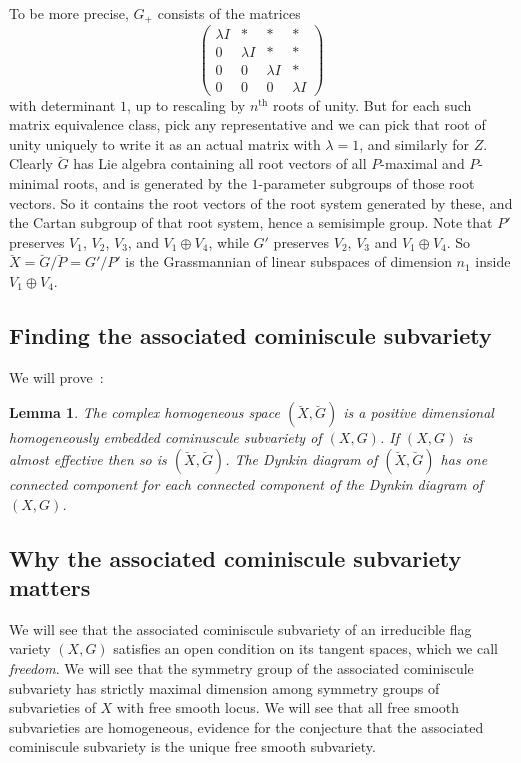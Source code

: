 \documentclass[a4paper,10pt]{amsart}
\newtheorem{lemma}{Lemma}
\theoremstyle{remark}
\begin{document}
To be more precise, \(G_+\) consists of the matrices 
\[
\begin{pmatrix}
\lambda I&*&*&*\\
0&\lambda I&*&*\\
0&0&\lambda I&*\\
0&0&0&\lambda I
\end{pmatrix}
\]
with determinant \(1\), up to rescaling by \(n^{\text{th}}\) roots of unity.
But for each such matrix equivalence class, pick any representative and we can pick that root of unity uniquely to write it as an actual matrix with \(\lambda=1\), and similarly for \(Z\).
Clearly \(\breve{G}\) has Lie algebra containing all root vectors of all \(P\)-maximal and \(P\)-minimal roots, and is generated by the \(1\)-parameter subgroups of those root vectors.
So it contains the root vectors of the root system generated by these, and the Cartan subgroup of that root system, hence a semisimple group.
Note that \(P'\) preserves \(V_1\), \(V_2\), \(V_3\), and \(V_1\oplus V_4\), while
\(G'\) preserves \(V_2\), \(V_3\) and \(V_1\oplus V_4\).
So \(\breve{X}=\breve{G}/\breve{P}=G'/P'\) is the Grassmannian of linear subspaces of dimension \(n_1\) inside \(V_1\oplus V_4\).

\subsection{Finding the associated cominiscule subvariety}
We will prove~:
\begin{lemma}\label{lemma:associated.cominuscule}
The complex homogeneous space \((\breve{X},\breve{G})\) is a positive dimensional homogeneously embedded cominuscule subvariety of \((X,G)\).
If \((X,G)\) is almost effective then so is \((\breve{X},\breve{G})\).
The Dynkin diagram of \((\breve{X},\breve{G})\) has one connected component for each connected component of the Dynkin diagram of \((X,G)\).
\end{lemma}
\subsection{Why the associated cominiscule subvariety matters}
We will see  that the associated cominiscule subvariety of an irreducible flag variety \((X,G)\) satisfies an open condition on its tangent spaces, which we call \emph{freedom}.
We will see that the symmetry group of the associated cominiscule subvariety has strictly maximal dimension among symmetry groups of subvarieties of \(X\) with free smooth locus.
We will see that all free smooth subvarieties are homogeneous, evidence for the conjecture that the associated cominiscule subvariety is the unique free smooth subvariety.
\end{document}
